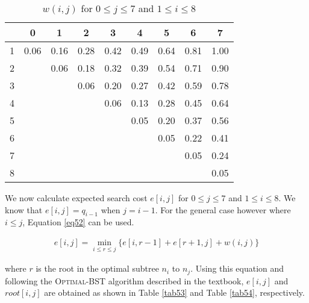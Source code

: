 \begin{table}[H]\centering
\begin{tabular}{c c c c c c c c c}
  & 0    & 1    & 2    & 3    & 4    & 5    & 6    & 7\\\hline
1 & 0.06 & 0.16 & 0.28 & 0.42 & 0.49 & 0.64 & 0.81 & 1.00\\ 
2 &      & 0.06 & 0.18 & 0.32 & 0.39 & 0.54 & 0.71 & 0.90\\ 
3 &      &      & 0.06 & 0.20 & 0.27 & 0.42 & 0.59 & 0.78\\ 
4 &      &      &      & 0.06 & 0.13 & 0.28 & 0.45 & 0.64\\ 
5 &      &      &      &      & 0.05 & 0.20 & 0.37 & 0.56\\ 
6 &      &      &      &      &      & 0.05 & 0.22 & 0.41\\ 
7 &      &      &      &      &      &      & 0.05 & 0.24\\
8 &      &      &      &      &      &      &      & 0.05\\\hline
\end{tabular}
\caption{$w(i,j)$ for $0 \leq j \leq 7$ and $1 \leq i \leq 8$}\label{tab52}
\end{table}

We now calculate expected search cost $e[i,j]$ for $0 \leq j \leq 7$ and $1 \leq i \leq 8$. We know that $e[i,j] = q_{i-1}$ when $j = i - 1$. For the general case however where $i \leq j$, Equation \ref{eq52} can be used.

\begin{equation}\label{eq52}
\begin{aligned}
e[i,j] = \min_{i \leq r \leq j} \{e[i, r-1] + e[r+1, j] + w(i,j)\}
\end{aligned}
\end{equation}

where $r$ is the root in the optimal subtree $n_i$ to $n_j$. Using this equation and following the \textsc{Optimal-BST} algorithm described in the textbook, $e[i, j]$ and $root[i,j]$ are obtained as shown in Table \ref{tab53} and Table \ref{tab54}, respectively.

